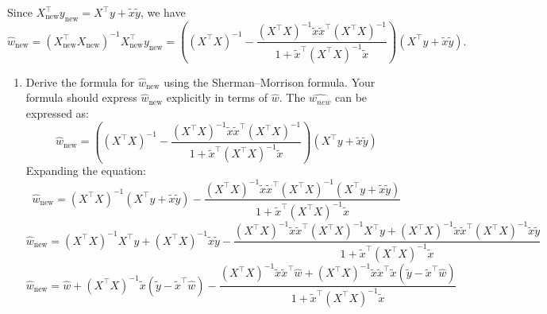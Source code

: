 \documentclass[a3paper,12pt]{extarticle} %
\begin{document}
\begin{enumerate}
        Since \( X_{\text{new}}^\top y_{\text{new}} = X^\top y + \tilde{x} \tilde{y} \), we have
        \[
        \hat{w}_{\text{new}} = (X_{\text{new}}^\top X_{\text{new}})^{-1} X_{\text{new}}^\top y_{\text{new}} = \left( (X^\top X)^{-1} - \frac{(X^\top X)^{-1} \tilde{x} \tilde{x}^\top (X^\top X)^{-1}}{1 + \tilde{x}^\top (X^\top X)^{-1} \tilde{x}} \right) (X^\top y + \tilde{x} \tilde{y}).
        \]

        \begin{enumerate}
            \item Derive the formula for \( \hat{w}_{\text{new}} \) using the Sherman–Morrison formula. Your formula should express \( \hat{w}_{\text{new}} \) explicitly in terms of \( \hat{w} \).
            The \(\hat{w_{new}}\) can be expressed as:
            \[
            \hat{w}_{\text{new}} = \left( (X^\top X)^{-1} - \frac{(X^\top X)^{-1} \tilde{x} \tilde{x}^\top (X^\top X)^{-1}}{1 + \tilde{x}^\top (X^\top X)^{-1} \tilde{x}} \right) (X^\top y + \tilde{x} \tilde{y})
            \]
            Expanding the equation:
            \[
            \hat{w}_{\text{new}} = (X^\top X)^{-1} (X^\top y + \tilde{x} \tilde{y})  - \frac{(X^\top X)^{-1} \tilde{x} \tilde{x}^\top (X^\top X)^{-1} (X^\top y + \tilde{x} \tilde{y})}{1 + \tilde{x}^\top (X^\top X)^{-1} \tilde{x}}
            \]
            \[
            \hat{w}_{\text{new}} = (X^\top X)^{-1} X^\top y + (X^\top X)^{-1} \tilde{x} \tilde{y} - \frac{(X^\top X)^{-1} \tilde{x} \tilde{x}^\top (X^\top X)^{-1} X^\top y + (X^\top X)^{-1} \tilde{x} \tilde{x}^\top (X^\top X)^{-1} \tilde{x} \tilde{y}}{1 + \tilde{x}^\top (X^\top X)^{-1} \tilde{x}}
            \]
            \[
            \hat{w}_{\text{new}} = \hat{w} + (X^\top X)^{-1} \tilde{x} (\tilde{y} - \tilde{x}^\top \hat{w}) - \frac{(X^\top X)^{-1} \tilde{x} \tilde{x}^\top \hat{w} + (X^\top X)^{-1} \tilde{x} \tilde{x}^\top \tilde{x} (\tilde{y} - \tilde{x}^\top \hat{w})}{1 + \tilde{x}^\top (X^\top X)^{-1} \tilde{x}}
            \]
            

\end{enumerate}
\end{enumerate}
\end{document}
